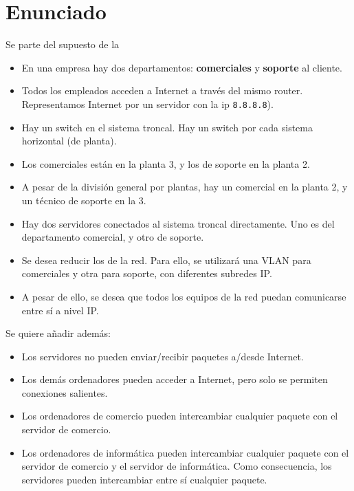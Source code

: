 \section{Enunciado}
Se parte del supuesto de la 
\begin{itemize}
\item En una empresa hay dos departamentos: \textbf{comerciales} y \textbf{soporte} al cliente.
\item Todos los empleados acceden a Internet a través del mismo router. Representamos Internet por un servidor con la ip \texttt{8.8.8.8}).
\item Hay un switch en el sistema troncal. Hay un switch por cada sistema horizontal (de planta).  
\item Los comerciales están en la planta 3, y los de soporte en la planta 2.
\item A pesar de la división general por plantas, hay un comercial en la planta 2, y un técnico de soporte en la 3.
\item Hay dos servidores conectados al sistema troncal directamente. Uno es del departamento comercial, y otro de soporte.
\item Se desea reducir los  de la red. Para ello, se utilizará una VLAN para comerciales y otra para soporte, con diferentes subredes IP.
\item A pesar de ello, se desea que todos los equipos de la red puedan comunicarse entre sí a nivel IP.
\end{itemize}

Se quiere añadir además:
\begin{itemize}
\item Los servidores no pueden enviar/recibir paquetes a/desde Internet.
\item Los demás ordenadores pueden acceder a Internet, pero solo se permiten conexiones salientes.
\item Los ordenadores de comercio pueden intercambiar cualquier paquete con el servidor de comercio.
\item Los ordenadores de informática pueden intercambiar cualquier paquete con el servidor de comercio y el servidor de informática. Como consecuencia, los servidores pueden intercambiar entre sí cualquier paquete.
\end{itemize}


